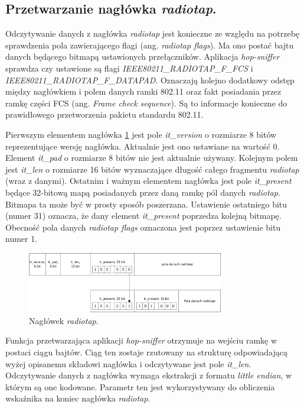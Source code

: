 \subsection{Przetwarzanie nagłówka \emph{radiotap}.}

Odczytywanie danych z nagłówka \emph{radiotap} jest konieczne ze względu na potrzebę sprawdzenia pola zawierającego flagi (ang. \emph{radiotap flags}). Ma ono postać bajtu danych będącego bitmapą ustawionych przełączników. Aplikacja \emph{hop-sniffer} sprawdza czy ustawione są flagi \emph{IEEE80211\_RADIOTAP\_F\_FCS} i \emph{IEEE80211\_RADIOTAP\_F\_DATAPAD}. Oznaczają kolejno dodatkowy odstęp między nagłówkiem i polem danych ramki 802.11 oraz fakt posiadania przez ramkę części FCS (ang. \emph{Frame check sequence}). Są to informacje konieczne do prawidłowego przetworzenia pakietu standardu 802.11.

Pierwszym elementem nagłówka \ref{RadiotapHeader} jest pole \emph{it\_version} o rozmiarze 8 bitów reprezentujące wersję nagłówka. Aktualnie jest ono ustawiane na wartość 0. Element \emph{it\_pad} o rozmiarze 8 bitów nie jest aktualnie używany. Kolejnym polem jest \emph{it\_len} o rozmiarze 16 bitów wyznaczające długość całego fragmentu \emph{radiotap} (wraz z danymi). Ostatnim i ważnym elementem nagłówka jest pole \emph{it\_present} będące 32-bitową mapą posiadanych przez daną ramkę pól danych \emph{radiotap}. Bitmapa ta może być w prosty sposób poszerzana. Ustawienie ostatniego bitu (numer 31) oznacza, że dany element \emph{it\_present} poprzedza kolejną bitmapę. Obecność pola danych \emph{radiotap flags} oznaczona jest poprzez ustawienie bitu numer 1. 

\begin{figure}[htb]
\begin{center}
\includegraphics[width=325px]{img/RadiotapHeader}
\caption{Nagłówek \emph{radiotap}.}
\label{RadiotapHeader}
\end{center}
\end{figure}

Funkcja przetwarzająca aplikacji \emph{hop-sniffer} otrzymuje na wejściu ramkę w postaci ciągu bajtów. Ciąg ten zostaje rzutowany na strukturę odpowiadającą wyżej opisanemu składowi nagłówka i odczytywane jest pole \emph{it\_len}. Odczytywanie danych z nagłówka wymaga ekstrakcji z formatu \emph{little endian}, w którym są one kodowane. Parametr ten jest wykorzystywany do obliczenia wskaźnika na koniec nagłówka \emph{radiotap}.

